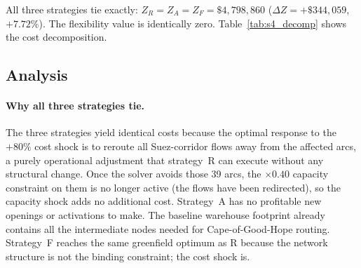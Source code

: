 All three strategies tie exactly: $Z_R = Z_A = Z_F = \$4{,}798{,}860$
($\Delta Z = +\$344{,}059$, $+7.72\%$). The flexibility value is
identically zero. Table~\ref{tab:s4_decomp} shows the cost
decomposition.

\begin{table}[H]
\centering
\caption{Cost decomposition --- scenario S4 (\$).
         All strategies identical; R column shown.}
\label{tab:s4_decomp}
\end{table}

\subsection{Analysis}
\label{sec:s4_analysis}

\paragraph{Why all three strategies tie.}
The three strategies yield identical costs because the optimal response
to the $+80\%$ cost shock is to reroute all Suez-corridor flows away
from the affected arcs, a purely operational adjustment that
strategy~R can execute without any structural change. Once the solver
avoids those 39 arcs, the $\times 0.40$ capacity constraint on them is
no longer active (the flows have been redirected), so the capacity
shock adds no additional cost. Strategy~A has no profitable new
openings or activations to make. The baseline warehouse footprint
already contains all the intermediate nodes needed for Cape-of-Good-Hope
routing. Strategy~F reaches the same greenfield optimum as R because the
network structure is not the binding constraint; the cost shock is.

